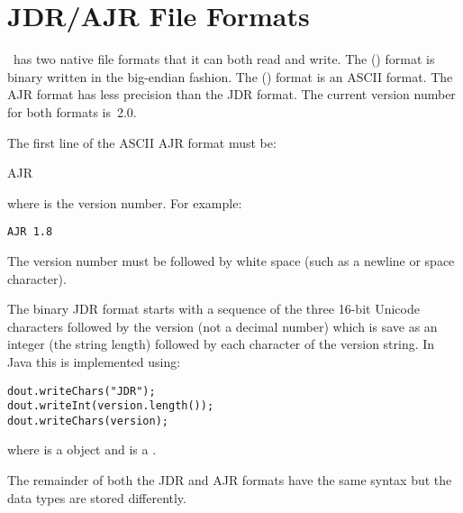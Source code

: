 \chapter{JDR/AJR File Formats}\label{sec:jdrajrformat}

\FlowframTk\ has two native file formats that it can both read and
write. The  () format is binary written
in the big-endian fashion. The  () format is
an ASCII format. The \gls*{AJR} format has less precision than the
\gls*{JDR} format. The current version number for both formats
is~2.0.

The first line of the ASCII \gls*{AJR} format must be:
\begin{compactcodebox}
AJR 
\end{compactcodebox}
where  is the version number. For example:
\begin{verbatim}
AJR 1.8
\end{verbatim}
The version number must be followed by white space (such as a
newline or space character).

The binary \gls*{JDR} format starts with a sequence of the three 16-bit Unicode
characters  followed by the version \emph{} (not a
decimal number) which is save as an integer (the string length)
followed by each character of the version string. In Java this is
implemented using:
\begin{verbatim}
dout.writeChars("JDR");
dout.writeInt(version.length());
dout.writeChars(version);
\end{verbatim}
where  is a  object
and  is a .

The remainder of both the \gls*{JDR} and \gls*{AJR} formats have the
same syntax but the data types are stored differently.

